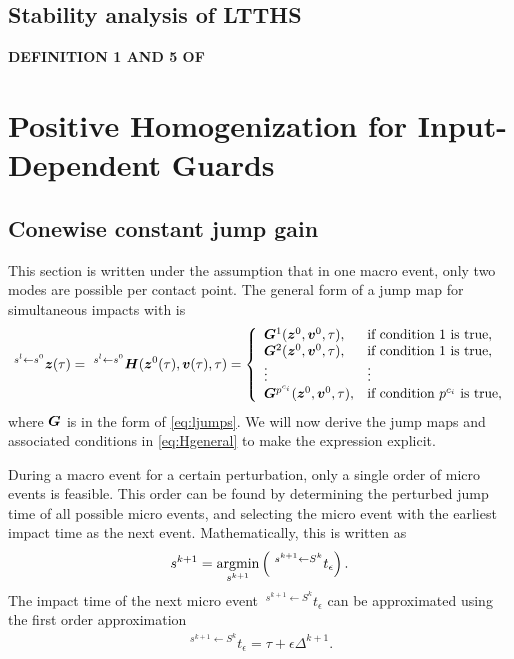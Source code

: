 \documentclass[../DC2017114Bouma.tex]{subfiles}
\begin{document}
\section{Stability analysis of LTTHS}\label{app:LTTHSstab}
\textbf{DEFINITION 1 AND 5 OF \cite{Rijnen2017}}
\pagestyle{fancyreport}
\cleartooddpage
\pagestyle{fancyreport}
\chapter{Positive Homogenization for Input-Dependent Guards}
\section{Conewise constant jump gain}
This section is written under the assumption that in one macro event, only two modes are possible per contact point. The general form of a jump map for simultaneous impacts with is 
\begin{align}
\ ^{s^l\leftarrow s^0}{\boldsymbol{z}}(\tau)= \ ^{s^l \leftarrow s^0}{\boldsymbol{H}}({\boldsymbol{z}}^{0}(\tau),{\boldsymbol{v}}(\tau),\tau) = \left\lbrace\begin{array}{ll}
{\boldsymbol{G}}^1({\boldsymbol{z}}^0,{\boldsymbol{v}}^0,\tau), & \text{if condition 1 is true},\\
{\boldsymbol{G}}^2({\boldsymbol{z}}^0,{\boldsymbol{v}}^0,\tau), & \text{if condition 1 is true},\\
\vdots & \vdots\\
{\boldsymbol{G}}^{p^{c_i}}({\boldsymbol{z}}^0,{\boldsymbol{v}}^0,\tau), & \text{if condition }p^{c_i}\text{ is true},
\end{array}\right.\label{eq:Hgeneral}
\end{align}
where ${\boldsymbol{G}}$ is in the form of \eqref{eq:ljumps}. We will now derive the jump maps and associated conditions in \eqref{eq:Hgeneral} to make the expression explicit.

During a macro event for a certain perturbation, only a single order of micro events is feasible. This order can be found by determining the perturbed jump time of all possible micro events, and selecting the micro event with the earliest impact time as the next event. Mathematically, this is written as
\begin{align}
s^{k+1} = \underset{s^{k+1}}{\operatorname{\text{argmin}}}\left(\ ^{s^{k+1} \leftarrow S^{k}}t_\epsilon\right).\label{eq:argmin1}
\end{align}
The impact time of the next micro event $\ ^{s^{k+1} \leftarrow S^{k}}t_\epsilon$ can be approximated using the first order approximation
\begin{align}
\ ^{s^{k+1} \leftarrow S^{k}}t_\epsilon = \tau + \epsilon\Delta^{k+1}.
\end{align}
\end{document}
